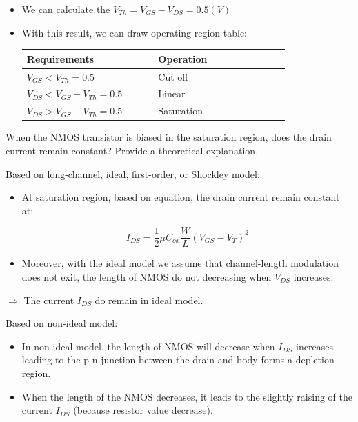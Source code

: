 \begin{question}
\begin{answer}
\begin{itemize}[label=-]
			\item We can calculate the $V_{Th} = V_{GS} - V_{DS} = 0.5(V)$
			
			\item With this result, we can draw operating region table:
			
			\begin{tabular}{|p{0.4\linewidth} | p{0.4\linewidth} |}
				\hline
				Requirements & Operation \\
				\hline
				$V_{GS} < V_{Th} = 0.5$ & Cut off \\
				\hline
				$V_{DS} < V_{GS} - V_{Th} = 0.5$ & Linear \\
				\hline
				$V_{DS} > V_{GS} - V_{Th} = 0.5$ & Saturation\\
				\hline
			\end{tabular} 
		\end{itemize}
	\end{answer}
	
	\item When the NMOS transistor is biased in the saturation region, does the drain current remain constant? Provide a theoretical explanation.
	
	\begin{answer}
		Based on long-channel, ideal, first-order, or Shockley model:
		
		\begin{itemize}[label=-]
			\item At saturation region, based on equation, the drain current remain constant at:
			
			\[ I_{DS} = \dfrac{1}{2} \mu C_{ox} \dfrac{W}{L} (V_{GS} - V_{T})^{2}\]
			
			\item Moreover, with the ideal model we assume that channel-length modulation does not exit, the length of NMOS do not decreasing when $V_{DS}$ increases.
			
		\end{itemize}
		
		$\Rightarrow$ The current $I_{DS}$ do remain in ideal model.
		
		Based on non-ideal model:
		
		\begin{itemize}[label=-]
			\item In non-ideal model, the length of NMOS will decrease when $I_{DS}$ increases leading to the p-n junction between the drain and body forms a depletion region.
			
			\item When the length of the NMOS decreases, it leads to the slightly raising of the current $I_{DS}$ (because resistor value decrease).
			

\end{itemize}
\end{answer}
\end{question}
